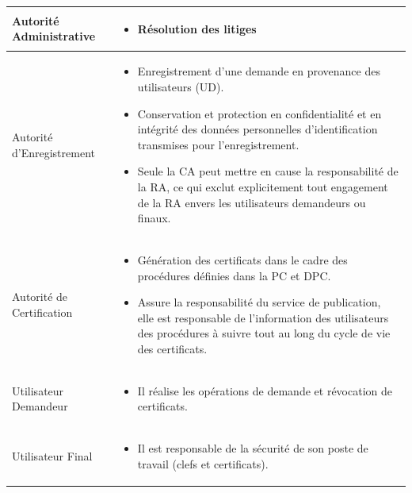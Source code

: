 \documentclass[a4paper,11pt,french]{book}
\begin{document}
\begin{tabular}{|l|p{10cm}|}
  \hline
  Autorité Administrative &  
  \begin{itemize}
  \item Résolution des litiges
   \end{itemize}

 \\
  \hline
  Autorité d'Enregistrement & 
  \begin{itemize}
\item Enregistrement d’une demande en provenance des utilisateurs (UD).
\item Conservation et protection en confidentialité et en intégrité des données personnelles d’identification transmises pour l’enregistrement.
\item Seule la CA peut mettre en cause la responsabilité de la RA, ce qui exclut explicitement tout engagement de la RA envers les utilisateurs demandeurs ou finaux.

  \end{itemize}
  \\
  \hline
  Autorité de Certification &
  \begin{itemize}
\item Génération des certificats dans le cadre des procédures définies dans la PC et DPC.
\item Assure la responsabilité du service de publication, elle est responsable de l'information des utilisateurs des procédures à suivre tout au long du cycle de vie des certificats.


  \end{itemize}
 \\
 \hline
 Utilisateur Demandeur &
 \begin{itemize}
\item Il réalise les opérations de demande et révocation de certificats.
 
 \end{itemize} 
  
 \\
 \hline
 Utilisateur Final &
 \begin{itemize}
\item Il est responsable de la sécurité de son poste de travail (clefs et certificats).
 
 \end{itemize}
\\
\hline
  
\end{tabular}             
\end{document}
